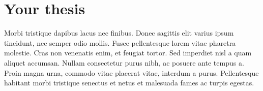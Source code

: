 \chapter{Your thesis}\label{chp:stuff}
Morbi tristique dapibus lacus nec finibus. 
Donec sagittis elit varius ipsum tincidunt, nec semper odio mollis. 
Fusce pellentesque lorem vitae pharetra molestie. 
Cras non venenatis enim, et feugiat tortor. 
Sed imperdiet nisl a quam aliquet accumsan.
Nullam consectetur purus nibh, ac posuere ante tempus a. 
Proin magna urna, commodo vitae placerat vitae, interdum a purus. 
Pellentesque habitant morbi tristique senectus et netus et malesuada fames ac turpis egestas.
